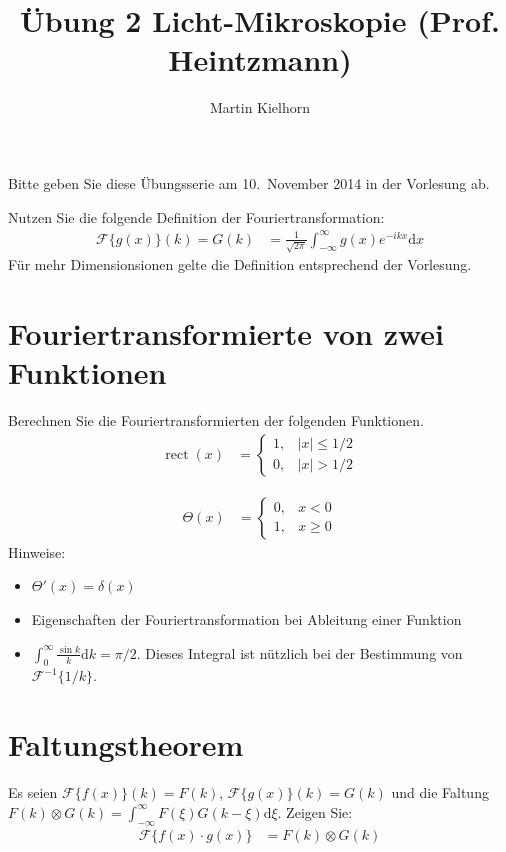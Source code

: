 \documentclass{article}
\DeclareMathOperator{\rect}{rect}
\begin{document}
\author{Martin Kielhorn}
\title{\"Ubung 2 Licht-Mikroskopie (Prof. Heintzmann)}
\maketitle

\noindent Bitte geben Sie diese \"Ubungsserie am 10.\ November 2014 in der Vorlesung ab.

\noindent Nutzen Sie die folgende Definition der Fouriertransformation:
\begin{align*}
  \mathcal{F}\{g(x)\}(k) = G(k) &= \frac{1}{\sqrt{2\pi}}\int_{-\infty}^\infty\!\!\! g(x) e^{-ikx} \textrm{d}x
\end{align*}
F\"ur mehr Dimensionsionen gelte die Definition entsprechend der Vorlesung.

\section{Fouriertransformierte von zwei Funktionen}
Berechnen Sie die Fouriertransformierten der folgenden Funktionen.
\begin{align}
  \rect(x) &=\begin{cases}
  1, & |x|\le 1/2 \\
  0, & |x| > 1/2
  \end{cases}
\end{align}

\begin{align}
  \Theta(x)&=\begin{cases}
  0, & x<0 \\
  1, & x \ge 0
  \end{cases}
\end{align}
Hinweise:
\begin{itemize}
  \item $\Theta'(x)=\delta(x)$
  \item  Eigenschaften der Fouriertransformation bei Ableitung einer Funktion
  \item $\int_0^\infty \frac{\sin k}{k}\textrm{d}k=\pi/2$. Dieses
    Integral ist n\"utzlich bei der Bestimmung von
    $\mathcal{F}^{-1}\{1/k\}$.
\end{itemize}

\section{Faltungstheorem}
Es seien $\mathcal{F}\{f(x)\}(k)=F(k)$, $\mathcal{F}\{g(x)\}(k)=G(k)$ und die Faltung $F(k)\otimes G(k)=\int_{-\infty}^\infty\!\!\!\! F(\xi)G(k-\xi)  \textrm{d}\xi$. Zeigen Sie:
\begin{align}
  \mathcal{F}\{f(x)\cdot g(x)\} &= F(k)\otimes G(k)
\end{align}
\end{document}
